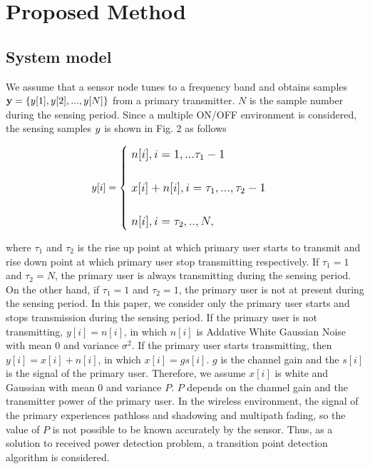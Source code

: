 \chapter[Active Period Detection of Primary Signal for Spectrum Database]{Proposed Method}
\label{chapter:Propose}
\section{System model}
\label{system}

We assume that a sensor node tunes to a frequency band and obtains samples ${\bf y}=\left\{y[1],y[2],...,y[N]\right\}$ from a primary transmitter. $N$ is the sample number during the sensing period. Since a multiple ON/OFF environment is considered, the sensing samples ${\boldmath y}$ is shown in Fig. 2 as follows

\begin{eqnarray}
{\large
y[i] = 
\begin{cases}
\;n[i],    i=1,...\tau_1-1 \\ \nonumber
\; \\ \nonumber
\;x[i]+n[i], i=\tau_1,...,\tau_2-1 \\
\; \\ \nonumber
\;n[i],    i=\tau_2,..,N,
\end{cases}
}
\end{eqnarray}

where $\tau_1$ and $\tau_2$ is the rise up point at which primary user starts to transmit and rise down point at which primary user stop transmitting respectively. If $\tau_1=1$ and $\tau_2=N$, the primary user is always transmitting during the sensing period. On the other hand, if $\tau_1=1$ and $\tau_2=1$, the primary user is not at present during the sensing period. In this paper, we consider only the primary user starts and stops transmission during the sensing period.
If the primary user is not transmitting, $y[i] = n[i]$, in which $n[i]$ is Addative White Gaussian Noise with mean 0 and variance $\sigma^2$. If the primary user starts transmitting, then $y[i] = x[i] + n[i]$, in which $x[i] = gs[i]$. $g$ is the channel gain and the $s[i]$ is the signal of the primary user. Therefore, we assume $x[i]$ is white and Gaussian with mean 0 and variance $P$. $P$ depends on the channel gain and the transmitter power of the primary user. In the wireless environment, the signal of the primary experiences pathloss and shadowing and  multipath fading, so the value of $P$ is not possible to be known accurately by the sensor. Thus, as a solution to received power detection problem, a transition point detection algorithm is considered. 

